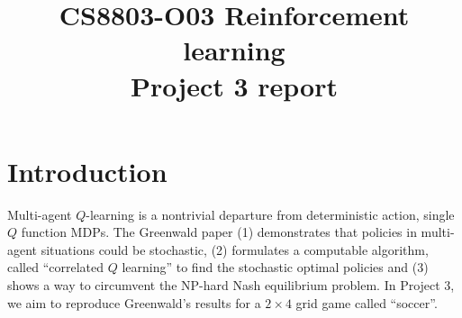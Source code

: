 \documentclass[conference]{IEEEtran}
\begin{document}
\title{CS8803-O03 Reinforcement learning\\Project 3 report}

\author{
}
\maketitle


\IEEEpeerreviewmaketitle
\section{Introduction}
Multi-agent $Q$-learning is a nontrivial departure from deterministic action, single $Q$ function MDPs. The Greenwald paper \cite{greenwald} (1) demonstrates that policies in multi-agent situations could be stochastic, (2) formulates a computable algorithm, called ``correlated $Q$ learning'' to find the stochastic optimal policies and (3) shows a way to circumvent the NP-hard Nash equilibrium problem. In Project 3, we aim to reproduce Greenwald's results for a $2\times4$ grid game called ``soccer''.

\end{document}
